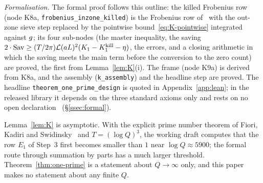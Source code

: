 \emph{Formalisation.} The formal proof follows this outline: the killed Frobenius row (node K8a, \texttt{frobenius\_inzone\_killed}) is
the Frobenius row of~\cite{DSouza} with the out-zone sieve step replaced by the pointwise bound~\eqref{eq:K-pointwise} integrated against
$g$; its four sub-nodes (the master inequality, the saving $2\cdot\mathrm{Sav}\ge(T/2\pi)\mathcal L(aL)^2(K_1-K_1^{\rm kill}-\eta)$, the errors, and a
closing arithmetic in which the saving meets the main term before the conversion to the zero count) are proved, the first from
Lemma~\ref{lem:K}(i). The frame (node K9a) is derived from K8a, and the assembly (\texttt{k\_assembly}) and the
headline step are proved. The headline \texttt{theorem\_one\_prime\_design} is quoted in Appendix~\ref{app:lean}; in the
released library it depends on the three standard axioms only and rests on no open declaration \tagL\ (\S\ref{ssec:formal}).

\begin{remark}[Thresholds]\label{rem:K-asymptotic}
Lemma~\ref{lem:K} is asymptotic. With the explicit prime number theorem of Fiori, Kadiri and Swidinsky~\cite{FKS} and $T=(\log Q)^3$, the
working draft computes that the row $E_1$ of Step~3 first becomes smaller than $1$ near $\log Q\approx5900$; the
formal route through summation by parts has a much larger threshold. Theorem~\ref{thm:one-prime} is a statement about $Q\to\infty$ only,
and this paper makes no statement about any finite $Q$.
\end{remark}

